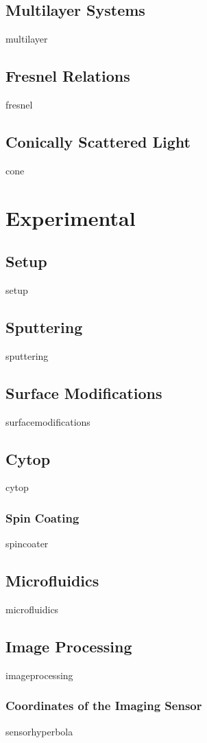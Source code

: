 \documentclass[12pt,a4paper,titlepage,onecolumn]{report}
\begin{document}
\section{Multilayer Systems}
{multilayer}
\section{Fresnel Relations}
{fresnel}\label{sec:fresnelexist}
\section{Conically Scattered Light}\label{sec:coneexist}
{cone}

\chapter{Experimental}\label{ch:experimental}
\section{Setup}
{setup}
\section{Sputtering}
{sputtering}\label{sec:expsputtering}
\section{Surface Modifications}
{surfacemodifications}
\section{Cytop}
{cytop}
\subsection{Spin Coating}
{spincoater}
\section{Microfluidics}
{microfluidics}
\section{Image Processing}
{imageprocessing}
\subsection{Coordinates of the Imaging Sensor}
{sensorhyperbola}
\end{document}

